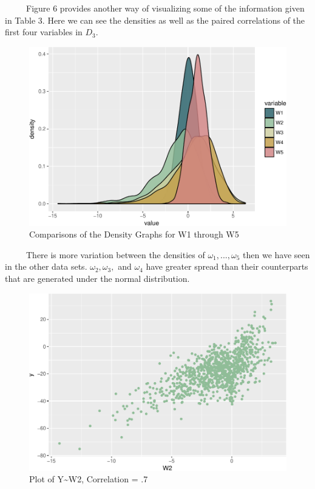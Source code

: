 \documentclass[12pt,twoside]{reedthesis}
\begin{document}
  ~~~~~Figure 6 provides another way of visualizing some of the
  information given in Table 3. Here we can see the densities as well as
  the paired correlations of the first four variables in \(D_3\).
  
  \begin{figure}[htbp]
  \centering
  \includegraphics{Thesis_files/figure-latex/compw1w5-1.pdf}
  \caption{\label{fig:compw1w5}Comparisons of the Density Graphs for W1
  through W5}
  \end{figure}
  
  ~~~~~There is more variation between the densities of
  \(\omega_1,...,\omega_5\) then we have seen in the other data sets.
  \(\omega_2,\omega_3,\) and \(\omega_4\) have greater spread than their
  counterparts that are generated under the normal distribution.
  
  \begin{figure}[htbp]
  \centering
  \includegraphics{Thesis_files/figure-latex/yw2-1.pdf}
  \caption{\label{fig:yw2}Plot of Y\textasciitilde{}W2, Correlation = .7}
  \end{figure}
  
\end{document}
